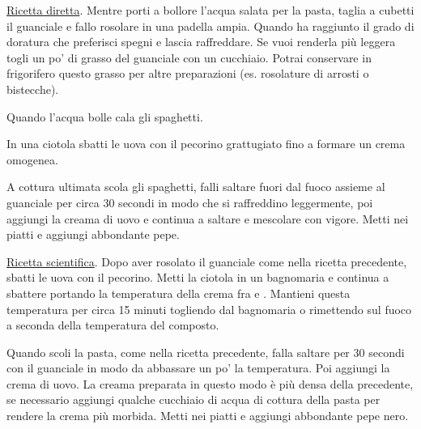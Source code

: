 \begin{method}
	\underline{Ricetta diretta}. Mentre porti a bollore l'acqua salata per la pasta, taglia a cubetti il guanciale e fallo rosolare in una padella ampia. Quando ha raggiunto il grado di doratura che preferisci spegni e lascia raffreddare. Se vuoi renderla più leggera togli un po' di grasso del guanciale con un cucchiaio. Potrai conservare in frigorifero questo grasso per altre preparazioni (es. rosolature di arrosti o bistecche). 

	Quando l'acqua bolle cala gli spaghetti.

	In una ciotola sbatti le uova con il pecorino grattugiato fino a formare un crema omogenea.

	A cottura ultimata scola gli spaghetti, falli saltare fuori dal fuoco assieme al guanciale per circa 30 secondi in modo che si raffreddino leggermente, poi aggiungi la creama di uovo e continua a saltare e mescolare con vigore. Metti nei piatti e aggiungi abbondante pepe.

	\underline{Ricetta scientifica}. Dopo aver rosolato il guanciale come nella ricetta precedente, sbatti le uova con il pecorino. Metti la ciotola in un bagnomaria e continua a sbattere portando la temperatura della crema fra  e . Mantieni questa temperatura per circa 15 minuti togliendo dal bagnomaria o rimettendo sul fuoco a seconda della temperatura del composto.

	Quando scoli la pasta, come nella ricetta precedente, falla saltare per 30 secondi con il guanciale in modo da abbassare un po' la temperatura. Poi aggiungi la crema di uovo. La creama preparata in questo modo è più densa della precedente, se necessario aggiungi qualche cucchiaio di acqua di cottura della pasta per rendere la crema più morbida. Metti nei piatti e aggiungi abbondante pepe nero.


\end{method}




